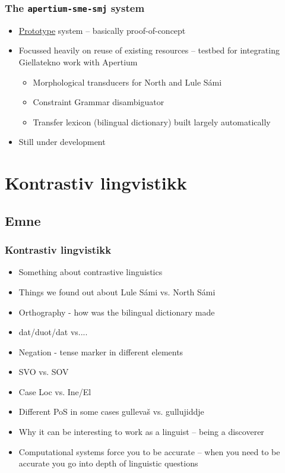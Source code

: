 \documentclass{beamer}
\begin{document}
\begin{frame}
\frametitle{The {\tt apertium-sme-smj} system}

\begin{itemize}
  \item \underline{Prototype} system -- basically proof-of-concept
  \item Focussed heavily on reuse of existing resources -- testbed for 
    integrating Giellatekno work with Apertium
  \begin{itemize}
    \item Morphological transducers for North and Lule Sámi
    \item Constraint Grammar disambiguator
    \item Transfer lexicon (bilingual dictionary) built largely automatically
  \end{itemize}
  \item Still under development
\end{itemize}

\end{frame}



\section{Kontrastiv lingvistikk} 
\subsection{Emne}
\begin{frame}\frametitle{Kontrastiv lingvistikk}
\begin{itemize}
\item Something about contrastive linguistics \pause
\item Things we found out about Lule Sámi vs. North Sámi \pause
\item Orthography - how was the bilingual dictionary made \pause
\item dat/duot/dat vs....\pause
\item Negation - tense marker in different elements \pause
\item SVO vs. SOV \pause
\item Case Loc vs. Ine/El \pause
\item Different PoS in some cases gullevaš vs. gullujiddje \pause
\item Why it can be interesting to work as a linguist -- being a discoverer \pause
\item Computational systems force you to be accurate -- when you need to be accurate you go into depth of linguistic questions
\end{itemize} 
\end{frame}
\end{document}
